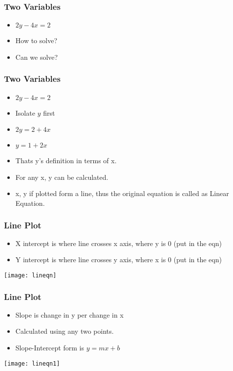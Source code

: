  \begin{frame}[fragile]\frametitle{Two Variables}
 
\begin{itemize}
\item $2y - 4x = 2$
\item How to solve?
\item Can we solve?
\end{itemize}
\end{frame}

 \begin{frame}[fragile]\frametitle{Two Variables}
 
\begin{itemize}
\item $2y - 4x = 2$
\item Isolate $y$ first 
\item $2y = 2 + 4x$
\item $y = 1 + 2x$
\item Thats y's definition in terms of x.
\item For any x, y can be calculated.
\item x, y if plotted form a line, thus the original equation is called as Linear Equation.
\end{itemize}
\end{frame}

 \begin{frame}[fragile]\frametitle{Line Plot}
 
\begin{itemize}
\item X intercept is where line crosses x axis, where y is 0 (put in the eqn)
\item Y intercept is where line crosses y axis, where x is 0 (put in the eqn)
\end{itemize}
\begin{center}
\texttt{[image: lineqn]}
\end{center}
\end{frame}


 \begin{frame}[fragile]\frametitle{Line Plot}
 
\begin{itemize}
\item Slope is change in y per change in x
\item Calculated using any two points.
\item Slope-Intercept form is $y = mx + b$
\end{itemize}
\begin{center}
\texttt{[image: lineqn1]}
\end{center}
\end{frame}

